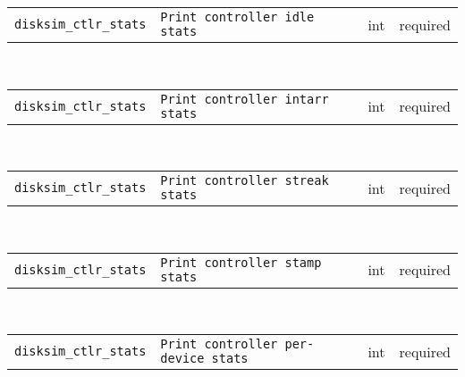 \noindent 
\begin{tabular}{|p{\lpmodwidth}|p{\lpnamewidth}|p{0.5in}|p{0.5in}|}
\cline{1-4}
\texttt{disksim\_ctlr\_stats} & \texttt{Print controller idle stats} & int & required \\ 
\cline{1-4}
\end{tabular}\\ 
\noindent 
\begin{tabular}{|p{\lpmodwidth}|p{\lpnamewidth}|p{0.5in}|p{0.5in}|}
\cline{1-4}
\texttt{disksim\_ctlr\_stats} & \texttt{Print controller intarr stats} & int & required \\ 
\cline{1-4}
\end{tabular}\\ 
\noindent 
\begin{tabular}{|p{\lpmodwidth}|p{\lpnamewidth}|p{0.5in}|p{0.5in}|}
\cline{1-4}
\texttt{disksim\_ctlr\_stats} & \texttt{Print controller streak stats} & int & required \\ 
\cline{1-4}
\end{tabular}\\ 
\noindent 
\begin{tabular}{|p{\lpmodwidth}|p{\lpnamewidth}|p{0.5in}|p{0.5in}|}
\cline{1-4}
\texttt{disksim\_ctlr\_stats} & \texttt{Print controller stamp stats} & int & required \\ 
\cline{1-4}
\end{tabular}\\ 
\noindent 
\begin{tabular}{|p{\lpmodwidth}|p{\lpnamewidth}|p{0.5in}|p{0.5in}|}
\cline{1-4}
\texttt{disksim\_ctlr\_stats} & \texttt{Print controller per-device stats} & int & required \\ 
\cline{1-4}
\end{tabular}\\ 
